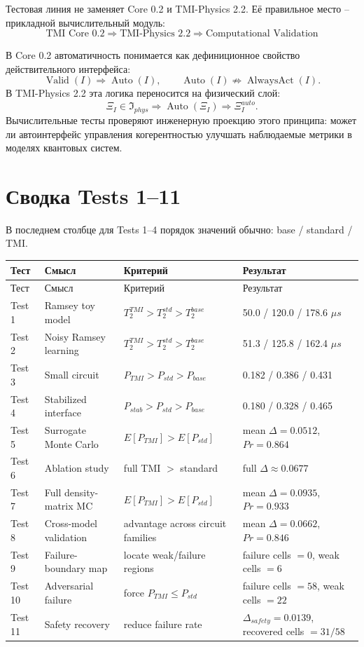 \documentclass[12pt,a4paper]{article}
\newcommand{\Auto}{\operatorname{Auto}}
\begin{document}
Тестовая линия не заменяет Core 0.2 и TMI-Physics 2.2. Её правильное место -- прикладной вычислительный модуль:
\[
\boxed{
\text{TMI Core 0.2}
\Rightarrow
\text{TMI-Physics 2.2}
\Rightarrow
\text{Computational Validation}
}
\]

В Core 0.2 автоматичность понимается как дефиниционное свойство действительного интерфейса:
\[
\operatorname{Valid}(I)\Rightarrow \Auto(I),
\qquad
\Auto(I)\not\Rightarrow \operatorname{AlwaysAct}(I).
\]
В TMI-Physics 2.2 эта логика переносится на физический слой:
\[
\Xi_I\in\mathfrak I_{phys}
\Rightarrow
\Auto(\Xi_I)
\Rightarrow
\Xi_I^{auto}.
\]
Вычислительные тесты проверяют инженерную проекцию этого принципа: может ли автоинтерфейс управления когерентностью улучшать наблюдаемые метрики в моделях квантовых систем.

\section{Сводка Tests 1--11}

В последнем столбце для Tests 1--4 порядок значений обычно: base / standard / TMI.

\begin{longtable}{p{2.0cm}p{3.9cm}p{4.2cm}p{5.0cm}}
\toprule
Тест & Смысл & Критерий & Результат \\
\midrule
\endfirsthead
\toprule
Тест & Смысл & Критерий & Результат \\
\midrule
\endhead

Test 1 & Ramsey toy model & $T_2^{TMI}>T_2^{std}>T_2^{base}$ & 50.0 / 120.0 / 178.6 $\mu s$ \\
Test 2 & Noisy Ramsey learning & $T_2^{TMI}>T_2^{std}>T_2^{base}$ & 51.3 / 125.8 / 162.4 $\mu s$ \\
Test 3 & Small circuit & $P_{TMI}>P_{std}>P_{base}$ & 0.182 / 0.386 / 0.431 \\
Test 4 & Stabilized interface & $P_{stab}>P_{std}>P_{base}$ & 0.180 / 0.328 / 0.465 \\
Test 5 & Surrogate Monte Carlo & $E[P_{TMI}]>E[P_{std}]$ & mean $\Delta=0.0512$, $Pr=0.864$ \\
Test 6 & Ablation study & full TMI $>$ standard & full $\Delta\approx 0.0677$ \\
Test 7 & Full density-matrix MC & $E[P_{TMI}]>E[P_{std}]$ & mean $\Delta=0.0935$, $Pr=0.933$ \\
Test 8 & Cross-model validation & advantage across circuit families & mean $\Delta=0.0662$, $Pr=0.846$ \\
Test 9 & Failure-boundary map & locate weak/failure regions & failure cells $=0$, weak cells $=6$ \\
Test 10 & Adversarial failure & force $P_{TMI}\le P_{std}$ & failure cells $=58$, weak cells $=22$ \\
Test 11 & Safety recovery & reduce failure rate & $\Delta_{safety}=0.0139$, recovered cells $=31/58$ \\

\bottomrule
\end{longtable}
\end{document}
